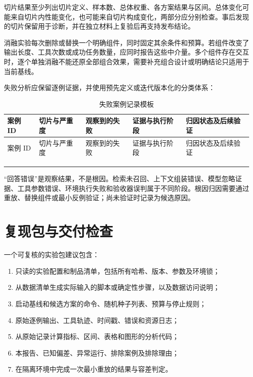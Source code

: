 \documentclass[../textbook.tex]{subfiles}
\begin{document}
切片结果至少列出切片定义、样本数、总体权重、各方案结果与区间。总体变化可能来自切片内性能变化，也可能来自切片构成变化，两部分应分别检查。事后发现的切片保留用于诊断，并在独立材料上复验后再支持发布结论。

消融实验每次删除或替换一个明确组件，同时固定其余条件和预算。若组件改变了输出长度、工具次数或成功任务数量，应同时报告这些中介量。多个组件存在交互时，逐个单独消融不能还原全部组合效果，需要补充组合设计或明确结论只适用于当前基线。

失败分析应保留逐例证据，并使用预先定义或迭代版本化的分类体系：
\begin{longtable}{@{}p{.15\linewidth}p{.15\linewidth}p{.18\linewidth}p{.17\linewidth}p{.22\linewidth}@{}}
\caption{失败案例记录模板}\label{tab:appendix-failure-log}\\
\toprule
案例 ID & 切片与严重度 & 观察到的失败 & 证据与执行阶段 & 归因状态及后续验证\\\midrule
\endfirsthead
\toprule
案例 ID & 切片与严重度 & 观察到的失败 & 证据与执行阶段 & 归因状态及后续验证\\\midrule
\endhead
 &  &  &  &  \\
 &  &  &  &  \\
 &  &  &  &  \\
\bottomrule
\end{longtable}

“回答错误”是观察结果，不是根因。检索未召回、上下文组装错误、模型忽略证据、工具参数错误、环境执行失败和验收器误判属于不同阶段。根因归因需要通过重放、替换组件或最小反例验证；尚未验证时记录为候选原因。

\section{复现包与交付检查}

一个可复核的实验包建议包含：
\begin{enumerate}
 \item 只读的实验配置和制品清单，包括所有哈希、版本、参数及环境锁；
 \item 从数据清单生成实际输入的脚本或确定性步骤，以及数据访问说明；
 \item 启动基线和候选方案的命令、随机种子列表、预算与停止规则；
 \item 原始逐例输出、工具轨迹、时间戳、错误和资源日志；
 \item 从原始记录计算指标、区间、表格和图形的分析代码；
 \item 本报告、已知偏差、异常运行、排除案例及排除理由；
 \item 在隔离环境中完成一次最小重放的结果与容差判定。
\end{enumerate}
\end{document}
